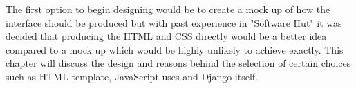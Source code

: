 \documentclass[../main.tex]{subfiles}
\begin{document}
\raggedright
The first option to begin designing would be to create a mock up of how the interface should be produced but with past experience in "Software Hut" it was decided that producing the HTML and CSS directly would be a better idea compared to a mock up which would be highly unlikely to achieve exactly. This chapter will discuss the design and reasons behind the selection of certain choices such as HTML template, JavaScript uses and Django itself. 
\end{document}
